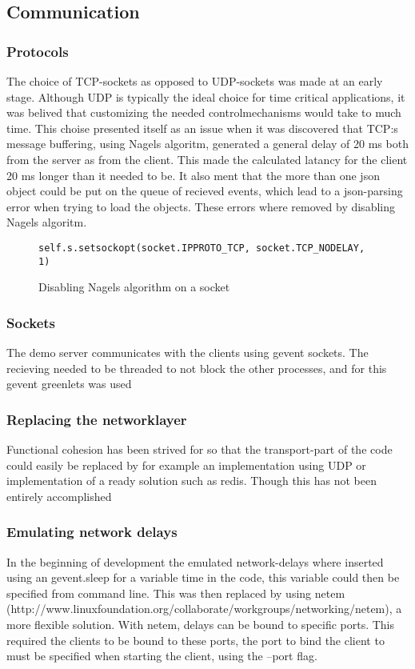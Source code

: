 \subsection{Communication}

\subsubsection{Protocols}
The choice of TCP-sockets as opposed to UDP-sockets was made at an early stage. Although UDP is typically the ideal choice for time critical applications, it was belived that customizing the needed controlmechanisms would take to much time. This choise presented itself as an issue when it was discovered that TCP:s message buffering, using Nagels algoritm, generated a general delay of 20 ms both from the server as from the client. This made the calculated latancy for the client 20 ms longer than it needed to be. It also ment that the more than one json object could be put on the queue of recieved events, which lead to a json-parsing error when trying to load the objects. These errors where removed by disabling Nagels algoritm.


\begin{figure}[h!]
\centering
\texttt{self.s.setsockopt(socket.IPPROTO\_TCP, socket.TCP\_NODELAY, 1)}
\caption{Disabling Nagels algorithm on a socket}
\end{figure}

\subsubsection{Sockets}
The demo server communicates with the clients using gevent sockets. The recieving needed to be threaded to not block the other processes, and for this gevent greenlets was used %

\subsubsection{Replacing the networklayer}
Functional cohesion has been strived for so that the transport-part of the code could easily be replaced by for example an implementation using UDP or implementation of a ready solution such as redis. Though this has not been entirely accomplished %

\subsubsection{Emulating network delays}
In the beginning of development the emulated network-delays where inserted using an gevent.sleep for a variable time in the code, this variable could then be specified from command line. This was then replaced by using netem (http://www.linuxfoundation.org/collaborate/workgroups/networking/netem), a more flexible solution. With netem, delays can be bound to specific ports. This required the clients to be bound to these ports, the port to bind the client to must be specified when starting the client, using the --port flag. 

